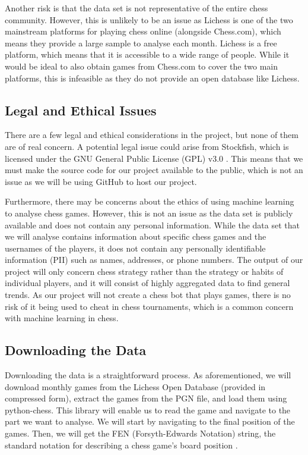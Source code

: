 \documentclass[%
 superscriptaddress,
showpacs,preprintnumbers,
 amsmath,
 amssymb,
 aps,
 pra,
showkeys,
onecolumn,
notitlepage,
11pt,
tightenlines      %
]{revtex4-1}
\begin{document}
Another risk is that the data set is not representative of the entire chess community. However, this is unlikely to be an issue as Lichess is one of the two mainstream platforms for playing chess online (alongside Chess.com), which means they provide a large sample to analyse each month. Lichess is a free platform, which means that it is accessible to a wide range of people. While it would be ideal to also obtain games from Chess.com to cover the two main platforms, this is infeasible as they do not provide an open database like Lichess.

\subsection{Legal and Ethical Issues}
There are a few legal and ethical considerations in the project, but none of them are of real concern. A potential legal issue could arise from Stockfish, which is licensed under the GNU General Public License (GPL) v3.0 \cite{stockfishRepository}. This means that we must make the source code for our project available to the public, which is not an issue as we will be using GitHub to host our project.

Furthermore, there may be concerns about the ethics of using machine learning to analyse chess games. However, this is not an issue as the data set is publicly available and does not contain any personal information. While the data set that we will analyse contains information about specific chess games and the usernames of the players, it does not contain any personally identifiable information (PII) such as names, addresses, or phone numbers. The output of our project will only concern chess strategy rather than the strategy or habits of individual players, and it will consist of highly aggregated data to find general trends. As our project will not create a chess bot that plays games, there is no risk of it being used to cheat in chess tournaments, which is a common concern with machine learning in chess.

\subsection{Downloading the Data}
Downloading the data is a straightforward process. As aforementioned, we will download monthly games from the Lichess Open Database (provided in compressed form), extract the games from the PGN file, and load them using python-chess. This library will enable us to read the game and navigate to the part we want to analyse. We will start by navigating to the final position of the games. Then, we will get the FEN (Forsyth-Edwards Notation) string, the standard notation for describing a chess game's board position \cite{pgnSpecification}. 
\end{document}
